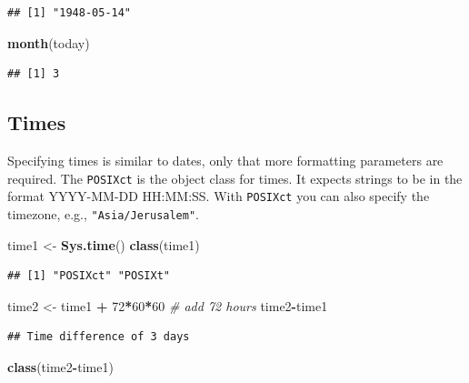 \documentclass[]{book}
\newenvironment{Shaded}{\begin{snugshade}}{\end{snugshade}}
\newcommand{\KeywordTok}[1]{\textcolor[rgb]{0.13,0.29,0.53}{\textbf{#1}}}
\newcommand{\DecValTok}[1]{\textcolor[rgb]{0.00,0.00,0.81}{#1}}
\newcommand{\StringTok}[1]{\textcolor[rgb]{0.31,0.60,0.02}{#1}}
\newcommand{\CommentTok}[1]{\textcolor[rgb]{0.56,0.35,0.01}{\textit{#1}}}
\newcommand{\OperatorTok}[1]{\textcolor[rgb]{0.81,0.36,0.00}{\textbf{#1}}}
\newcommand{\NormalTok}[1]{#1}
\theoremstyle{definition}
\theoremstyle{definition}
\theoremstyle{definition}
\theoremstyle{remark}
\begin{document}
\begin{verbatim}
## [1] "1948-05-14"
\end{verbatim}

\begin{Shaded}
\begin{Highlighting}[]
\KeywordTok{month}\NormalTok{(today)}
\end{Highlighting}
\end{Shaded}

\begin{verbatim}
## [1] 3
\end{verbatim}

\subsection{Times}\label{times}

Specifying times is similar to dates, only that more formatting
parameters are required. The \texttt{POSIXct} is the object class for
times. It expects strings to be in the format YYYY-MM-DD HH:MM:SS. With
\texttt{POSIXct} you can also specify the timezone, e.g.,
\texttt{"Asia/Jerusalem"}.

\begin{Shaded}
\begin{Highlighting}[]
\NormalTok{time1 <-}\StringTok{ }\KeywordTok{Sys.time}\NormalTok{()}
\KeywordTok{class}\NormalTok{(time1)}
\end{Highlighting}
\end{Shaded}

\begin{verbatim}
## [1] "POSIXct" "POSIXt"
\end{verbatim}

\begin{Shaded}
\begin{Highlighting}[]
\NormalTok{time2 <-}\StringTok{ }\NormalTok{time1 }\OperatorTok{+}\StringTok{ }\DecValTok{72}\OperatorTok{*}\DecValTok{60}\OperatorTok{*}\DecValTok{60} \CommentTok{# add 72 hours}
\NormalTok{time2}\OperatorTok{-}\NormalTok{time1}
\end{Highlighting}
\end{Shaded}

\begin{verbatim}
## Time difference of 3 days
\end{verbatim}

\begin{Shaded}
\begin{Highlighting}[]
\KeywordTok{class}\NormalTok{(time2}\OperatorTok{-}\NormalTok{time1)}
\end{Highlighting}
\end{Shaded}
\end{document}

